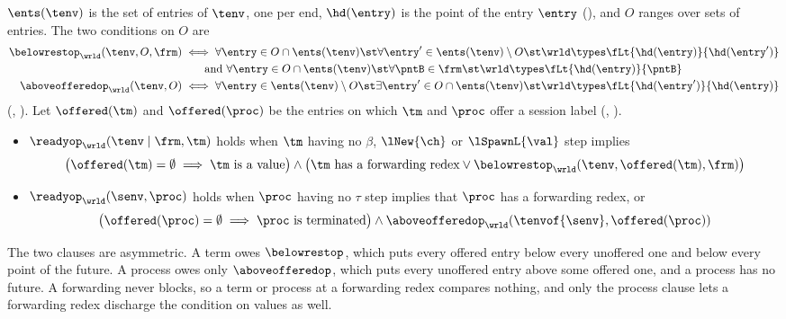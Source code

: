 \begin{definition}
\label{def:ready}
  $\ents(\tenv)$ is the set of entries of $\tenv$, one per end,
  $\hd(\entry)$ is the point of the entry $\entry$ (),
  and $O$ ranges over sets of entries. The two conditions on $O$ are
  \begin{align*}
    \belowrestop_{\wrld}(\tenv, O, \frm)
      &\iff
      \forall \entry \in O \cap \ents(\tenv) \st
        \forall \entry' \in \ents(\tenv) \setminus O \st
          \wrld \types \fLt{\hd(\entry)}{\hd(\entry')}
    \\
      &\qquad \text{and }
      \forall \entry \in O \cap \ents(\tenv) \st
        \forall \pntB \in \frm \st
          \wrld \types \fLt{\hd(\entry)}{\pntB}
    \\
    \aboveofferedop_{\wrld}(\tenv, O)
      &\iff
      \forall \entry \in \ents(\tenv) \setminus O \st
        \exists \entry' \in O \cap \ents(\tenv) \st
          \wrld \types \fLt{\hd(\entry')}{\hd(\entry)}
  \end{align*}
  (, ). Let $\offered(\tm)$ and
  $\offered(\proc)$ be the entries on which $\tm$ and $\proc$ offer a
  session label (, ).
  \begin{itemize}
    \item $\readyop_{\wrld}(\tenv \mid \frm, \tm)$ holds when $\tm$
      having no $\beta$, $\lNew{\ch}$ or $\lSpawnL{\val}$ step implies
      \[
        \big(\offered(\tm) = \emptyset \implies \tm \text{ is a value}\big)
        \land
        \big(\tm \text{ has a forwarding redex} \lor
          \belowrestop_{\wrld}(\tenv, \offered(\tm), \frm)\big)
      \]
    \item $\readyop_{\wrld}(\senv, \proc)$ holds when $\proc$ having no
      $\tau$ step implies that $\proc$ has a forwarding redex, or
      \[
        \big(\offered(\proc) = \emptyset \implies
          \proc \text{ is terminated}\big)
        \land
        \aboveofferedop_{\wrld}(\tenvof{\senv}, \offered(\proc))
      \]
  \end{itemize}
\end{definition}

The two clauses are asymmetric. A term owes $\belowrestop$, which puts
every offered entry below every unoffered one and below every point of
the future. A process owes only $\aboveofferedop$, which puts every
unoffered entry above some offered one, and a process has no future. A
forwarding never blocks, so a term or process at a forwarding redex
compares nothing, and only the process clause lets a forwarding redex
discharge the condition on values as well.

